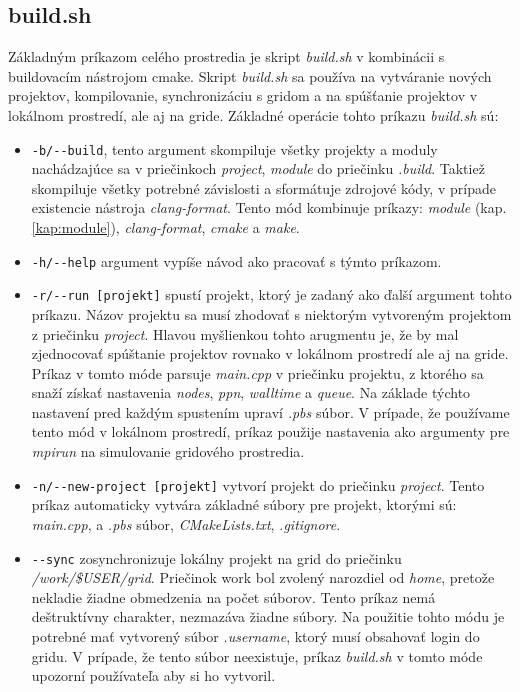 \subsection{build.sh}
Základným príkazom celého prostredia je skript \textit{build.sh} v kombinácii s buildovacím nástrojom cmake.
Skript \textit{build.sh} sa používa na vytváranie nových projektov, kompilovanie,
synchronizáciu s gridom a na spúšťanie projektov v lokálnom prostredí, ale aj na gride.
Základné operácie tohto príkazu \textit{build.sh} sú:
\begin{itemize}
\item
  \texttt{-b/-{}-build}, tento argument skompiluje všetky projekty a moduly nachádzajúce sa v priečinkoch \textit{project}, \textit{module} do priečinku \textit{.build}.
  Taktiež skompiluje všetky potrebné závislosti a sformátuje zdrojové kódy, v prípade existencie nástroja \textit{clang-format}.
  Tento mód kombinuje príkazy: \textit{module} (kap. \ref{kap:module}), \textit{clang-format}, \textit{cmake} a \textit{make}.
\item
  \texttt{-h/-{}-help} argument vypíše návod ako pracovať s týmto príkazom.
\item
  \texttt{-r/-{}-run [projekt]} spustí projekt, ktorý je zadaný ako ďalší argument tohto príkazu.
  Názov projektu sa musí zhodovať s niektorým vytvoreným projektom z priečinku \textit{project}.
  Hlavou myšlienkou tohto arugmentu je, že by mal zjednocovať spúštanie projektov rovnako v lokálnom prostredí ale aj na gride.
  Príkaz v tomto móde parsuje \textit{main.cpp} v priečinku projektu, z ktorého sa snaží získať nastavenia \textit{nodes}, \textit{ppn}, \textit{walltime} a \textit{queue}.
  Na základe týchto nastavení pred každým spustením upraví \textit{.pbs} súbor.
  V prípade, že používame tento mód v lokálnom prostredí,
  príkaz použije nastavenia ako argumenty pre \textit{mpirun} na simulovanie gridového prostredia.
\item
  \texttt{-n/-{}-new-project [projekt]} vytvorí projekt do priečinku \textit{project}.
  Tento príkaz automaticky vytvára základné súbory pre projekt, ktorými sú: \textit{main.cpp}, a \textit{.pbs} súbor, \textit{CMakeLists.txt}, \textit{.gitignore}.
\item
  \texttt{-{}-sync} zosynchronizuje lokálny projekt na grid do priečinku \textit{/work/\$USER/grid}.
  Priečinok work bol zvolený narozdiel od \textit{home}, pretože nekladie žiadne obmedzenia na počet súborov.
  Tento príkaz nemá deštruktívny charakter, nezmazáva žiadne súbory.
  Na použitie tohto módu je potrebné mať vytvorený súbor \textit{.username}, ktorý musí obsahovať login do gridu.
  V prípade, že tento súbor neexistuje, príkaz \textit{build.sh} v tomto móde upozorní používateľa aby si ho vytvoril.  
\end{itemize}

